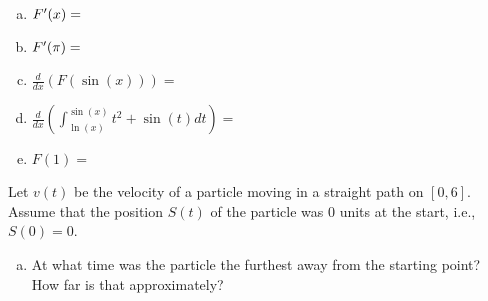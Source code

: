 \documentclass[answers]{exam}
\begin{document}
\begin{questions}
\begin{enumerate}[(a)]
	\hfill \break
	
	\item $F\rq{}(x) = $
	
	\hfill \break

	\item $F\rq{}(\pi) = $
	
	\hfill \break
		
	\item $\displaystyle \frac{d}{dx}\left(F(\sin(x))\right) = $
	
	\hfill \break
	
	\item $\frac{d}{dx}\left(\int_{\ln(x)}^{\sin(x)} t^2+\sin(t) dt \right) = $
	
	\hfill \break
	\hfill \break
	\hfill \break
	\hfill \break
	
	\item $F(1) = $
	
	\hfill \break
	\hfill \break
	\hfill \break
	\hfill \break
	
\end{enumerate}

\question Let $v(t)$ be the velocity of a particle moving in a straight path on $[0,6]$. Assume that the position $S(t)$ of the particle was 0 units at the start, i.e., $S(0) = 0$.

\begin{center}
	
	
\end{center}

\begin{enumerate}[(a)]
	
		
	\item At what time was the particle the furthest away from the starting point? How far is that approximately?
	
	\hfill \break
	\hfill \break
	\hfill \break
	

\end{enumerate}
\end{questions}
\end{document}
